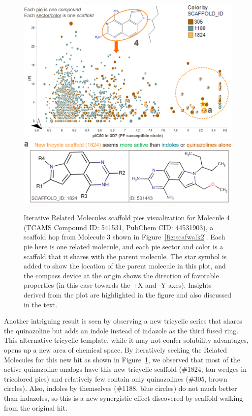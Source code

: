 \documentclass[11pt,letterpaper,biochem]{article}
\newcommand*\fref[1]{Figure~\ref{fig:#1}}
\begin{document}
\begin{figure}
  \centering
  \includegraphics[width=5.5in]{../fig/mol3_RGtool_scafpie_iter_plot_v2.png}\\
  \vspace{0.1in}
  \includegraphics[width=5in]{../fig/mol3_RGtool_scafpie_iter_struc_v2.png}
\caption{Iterative Related Molecules scaffold pies visualization for Molecule 4 (TCAMS Compound ID: 541531, PubChem CID: 44531903), a scaffold hop from Molecule 3 shown in \fref{scafwalk2}. Each pie here is one related molecule, and each pie sector and color is a scaffold that it shares with the parent molecule. The star symbol is added to show the location of the parent molecule in this plot, and the compass device at the origin shows the direction of favorable properties (in this case towards the +X and -Y axes). Insights derived from the plot are highlighted in the figure and also discussed in the text.}
\label{fig:scafwalk3}
\end{figure}

Another intriguing result is seen by observing a new tricyclic series that shares the quinazoline but adds an indole instead of indazole as the third fused ring. This alternative tricyclic template, while it may not confer solubility advantages, opens up a new area of chemical space. By iteratively seeking the Related Molecules for this new hit as shown in \fref{scafwalk3}, we observed that most of the active quinazoline analogs have this new tricyclic scaffold (\#1824, tan wedges in tricolored pies) and relatively few contain only quinazolines (\#305, brown circles). Also, indoles by themselves (\#1188, blue circles) do not much better than indazoles, so this is a new synergistic effect discovered by scaffold walking from the original hit.            
\end{document}
